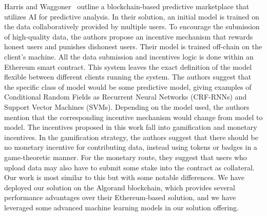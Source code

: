 \documentclass{ledger}
\begin{document}
Harris and Waggoner~\cite{sharingModels,harris2020leveraging,harris2020analysis} outline a blockchain-based predictive marketplace that utilizes AI for predictive analysis. In their solution, an initial model is trained on the data collaboratively provided by multiple users. To encourage the submission of high-quality data, the authors propose an incentive mechanism that rewards honest users and punishes dishonest users. Their model is trained off-chain on the client's machine. All the data submission and incentives logic is done within an Ethereum smart contract.
%
This system leaves the exact definition of the model flexible between different clients running the system. The authors suggest that the specific class of model would be some predictive model, giving examples of Conditional Random Fields as Recurrent Neural Networks (CRF-RNNs) and Support Vector Machines (SVMs). Depending on the model used, the authors mention that the corresponding incentive mechanism would change from model to model.
%
The incentives proposed in this work fall into gamification and monetary incentives. In the gamification strategy, the authors suggest that there should be no monetary incentive for contributing data, instead using tokens or badges in a game-theoretic manner. For the monetary route, they suggest that users who upload data may also have to submit some stake into the contract as collateral.
Our work is most similar to this but with some notable differences. We have deployed our solution on the Algorand blockchain, which provides several performance advantages over their Ethereum-based solution, and we have leveraged some advanced machine learning models in our solution offering.

\end{document}
